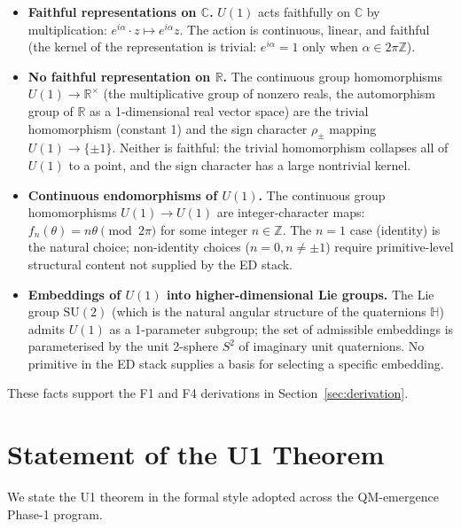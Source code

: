 \documentclass[11pt,a4paper]{article}
\begin{document}
\begin{itemize}
  \item \textbf{Faithful representations on $\mathbb{C}$.} $U(1)$ acts faithfully on $\mathbb{C}$ by multiplication: $e^{i \alpha} \cdot z \mapsto e^{i \alpha} z$. The action is continuous, linear, and faithful (the kernel of the representation is trivial: $e^{i \alpha} = 1$ only when $\alpha \in 2\pi \mathbb{Z}$).
  \item \textbf{No faithful representation on $\mathbb{R}$.} The continuous group homomorphisms $U(1) \to \mathbb{R}^\times$ (the multiplicative group of nonzero reals, the automorphism group of $\mathbb{R}$ as a 1-dimensional real vector space) are the trivial homomorphism (constant 1) and the sign character $\rho_\pm$ mapping $U(1) \to \{\pm 1\}$. Neither is faithful: the trivial homomorphism collapses all of $U(1)$ to a point, and the sign character has a large nontrivial kernel.
  \item \textbf{Continuous endomorphisms of $U(1)$.} The continuous group homomorphisms $U(1) \to U(1)$ are integer-character maps: $f_n(\theta) = n \theta \pmod{2\pi}$ for some integer $n \in \mathbb{Z}$. The $n = 1$ case (identity) is the natural choice; non-identity choices ($n = 0, n \neq \pm 1$) require primitive-level structural content not supplied by the ED stack.
  \item \textbf{Embeddings of $U(1)$ into higher-dimensional Lie groups.} The Lie group $\mathrm{SU}(2)$ (which is the natural angular structure of the quaternions $\mathbb{H}$) admits $U(1)$ as a 1-parameter subgroup; the set of admissible embeddings is parameterised by the unit 2-sphere $S^2$ of imaginary unit quaternions. No primitive in the ED stack supplies a basis for selecting a specific embedding.
\end{itemize}

These facts support the F1 and F4 derivations in Section~\ref{sec:derivation}.

\section{Statement of the U1 Theorem}\label{sec:theorem}

We state the U1 theorem in the formal style adopted across the QM-emergence Phase-1 program.
\end{document}
